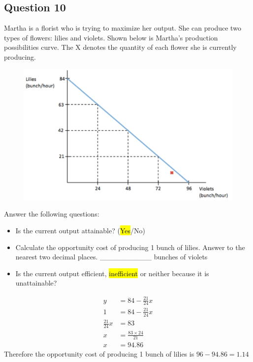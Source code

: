 \subsection{Question 10}
Martha is a florist who is trying to maximize her output. She can produce two types of flowers: lilies and violets. Shown below is Martha's production possibilities curve. The X denotes the quantity of each flower she is currently producing.
\begin{figure}[H]
	\centering
	\includegraphics[width=0.5\linewidth]{cml_1_10}
\end{figure}
\noindent Answer the following questions:
\begin{itemize}
	\item Is the current output attainable? (\hl{Yes}/No)
	\item Calculate the opportunity cost of producing 1 bunch of lilies. Answer to the nearest two decimal places. \_\_\_\_\_\_\_\_\_\_ bunches of violets
	\item Is the current output efficient, \hl{inefficient} or neither because it is unattainable?
\end{itemize}\vspace{1em}
\begin{align*}
	y &= 84 - \frac{21}{24}x\\
	1 &= 84 - \frac{21}{24}x\tag{Producing 1 bunch of lillies}\\
	\frac{21}{24}x &= 83\\
	x &= \frac{83\times24}{21}\\
	x &= 94.86
\end{align*}
Therefore the opportunity cost of producing 1 bunch of lilies is $96 - 94.86 = 1.14$